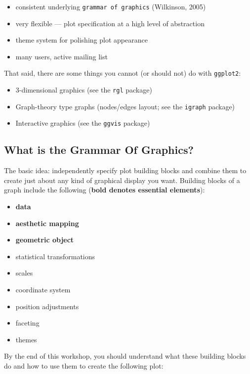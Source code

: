 \documentclass[
]{book}
\providecommand{\tightlist}{%
  \setlength{\itemsep}{0pt}\setlength{\parskip}{0pt}}
\begin{document}
\begin{itemize}
\tightlist
\item
  consistent underlying \texttt{grammar\ of\ graphics} (Wilkinson, 2005)
\item
  very flexible --- plot specification at a high level of abstraction
\item
  theme system for polishing plot appearance
\item
  many users, active mailing list
\end{itemize}

That said, there are some things you cannot (or should not) do with \texttt{ggplot2}:

\begin{itemize}
\tightlist
\item
  3-dimensional graphics (see the \texttt{rgl} package)
\item
  Graph-theory type graphs (nodes/edges layout; see the \texttt{igraph} package)
\item
  Interactive graphics (see the \texttt{ggvis} package)
\end{itemize}

\hypertarget{what-is-the-grammar-of-graphics}{%
\subsection{What is the Grammar Of Graphics?}\label{what-is-the-grammar-of-graphics}}

The basic idea: independently specify plot building blocks and combine them to create just
about any kind of graphical display you want. Building blocks of a graph include the
following (\textbf{bold denotes essential elements}):

\begin{itemize}
\tightlist
\item
  \textbf{data}
\item
  \textbf{aesthetic mapping}
\item
  \textbf{geometric object}
\item
  statistical transformations
\item
  scales
\item
  coordinate system
\item
  position adjustments
\item
  faceting
\item
  themes
\end{itemize}

By the end of this workshop, you should understand what these building blocks do and
how to use them to create the following plot:
\end{document}
